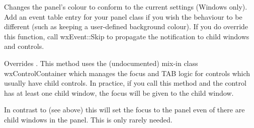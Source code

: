 


Changes the panel's colour to conform to the current settings (Windows only).
Add an event table entry for your panel class if you wish the behaviour
to be different (such as keeping a user-defined
background colour). If you do override this function, call wxEvent::Skip to
propagate the notification to child windows and controls.




\label{wxpanelsetfocus}


Overrides . This method
uses the (undocumented) mix-in class wxControlContainer which manages
the focus and TAB logic for controls which usually have child controls.
In practice, if you call this method and the control has at least
one child window, the focus will be given to the child window.




\label{wxpanelsetfocusignoringchildren}


In contrast to  (see above)
this will set the focus to the panel even of there are child windows
in the panel. This is only rarely needed.



